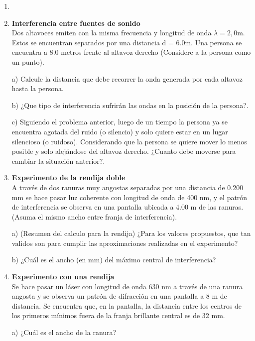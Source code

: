 \documentclass[letterpaper,11pt]{article}
\begin{document}
\vspace{-1cm}
\begin{enumerate}\setlength{\itemsep}{0.4cm}


\item[]

\item \textbf{Interferencia entre fuentes de sonido}\\
Dos altavoces emiten con la misma frecuencia  y longitud de onda $\lambda=2,0$m. Estos se encuentran separados por una distancia d = 6.0m.
Una persona se encuentra a 8.0 metros frente al altavoz derecho (Considere a la persona como un punto).

a) Calcule la distancia que debe recorrer la onda generada por cada altavoz hasta la persona.

b) ¿Que tipo de interferencia sufrirán las ondas en la posición de la persona?.

c) Siguiendo el problema anterior, luego de un tiempo la persona ya se encuentra agotada del ruido (o silencio) y solo quiere estar en un lugar silencioso (o ruidoso).
Considerando que la persona se quiere mover lo menos posible y solo alejándose del altavoz derecho. ¿Cuanto debe moverse para cambiar la situación anterior?.


\item \textbf{Experimento de la rendija doble}\\
A través de dos ranuras muy angostas separadas por una distancia de 0.200 mm se hace pasar luz coherente con longitud de onda de 400 nm, y el patrón de interferencia se observa en una pantalla ubicada a 4.00 m de las
ranuras. (Asuma el mismo ancho entre franja de interferencia).

a) (Resumen del calculo para la rendija) ¿Para los valores propuestos, que tan validos son para cumplir las aproximaciones realizadas en el experimento?

b) ¿Cuál es el ancho (en mm) del máximo central de interferencia?


\item \textbf{Experimento con una rendija}\\
Se hace pasar un láser con longitud de onda 630 nm a través de una ranura angosta y se observa un patrón de difracción en una pantalla a 8 m de distancia. Se encuentra que, en la pantalla, la distancia entre los centros de los primeros mínimos fuera de la franja brillante central es de 32 mm. 

a) ¿Cuál es el ancho de la ranura?


\end{enumerate}
\end{document}
